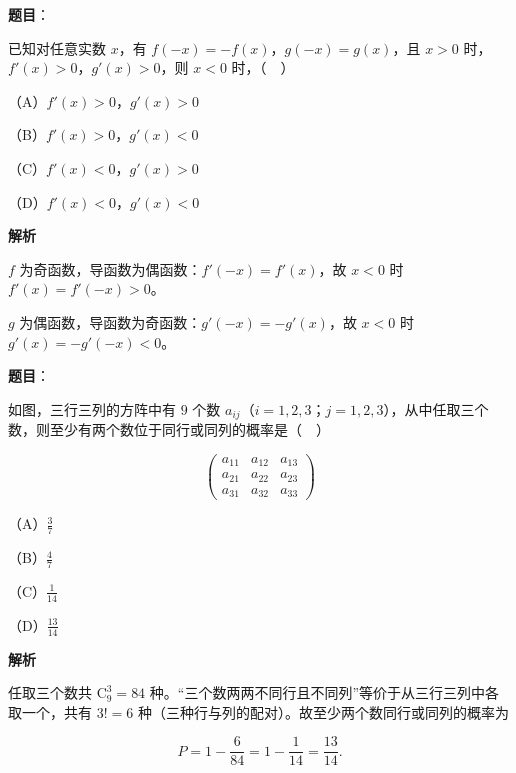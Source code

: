 \begin{answer}

\textbf{题目}：

已知对任意实数 $x$，有 $f(-x)=-f(x)$，$g(-x)=g(x)$，且 $x>0$ 时，$f'(x)>0$，$g'(x)>0$，则 $x<0$ 时，（　）

（A）$f'(x)>0$，$g'(x)>0$

（B）$f'(x)>0$，$g'(x)<0$

（C）$f'(x)<0$，$g'(x)>0$

（D）$f'(x)<0$，$g'(x)<0$

\textbf{解析}

$f$ 为奇函数，导函数为偶函数：$f'(-x)=f'(x)$，故 $x<0$ 时 $f'(x)=f'(-x)>0$。

$g$ 为偶函数，导函数为奇函数：$g'(-x)=-g'(x)$，故 $x<0$ 时 $g'(x)=-g'(-x)<0$。


\end{answer}
\begin{answer}

\textbf{题目}：

如图，三行三列的方阵中有 $9$ 个数 $a_{ij}$（$i=1,2,3$；$j=1,2,3$），从中任取三个数，则至少有两个数位于同行或同列的概率是（　）

\nopagebreak[4]
\[\begin{pmatrix}a_{11}&a_{12}&a_{13}\\ a_{21}&a_{22}&a_{23}\\ a_{31}&a_{32}&a_{33}\end{pmatrix}\]

（A）$\frac37$

（B）$\frac47$

（C）$\frac1{14}$

（D）$\frac{13}{14}$

\textbf{解析}

任取三个数共 $\mathrm C_9^3=84$ 种。“三个数两两不同行且不同列”等价于从三行三列中各取一个，共有 $3!=6$ 种（三种行与列的配对）。故至少两个数同行或同列的概率为

\nopagebreak[4]
\[P=1-\frac6{84}=1-\frac1{14}=\frac{13}{14}.\]


\end{answer}
